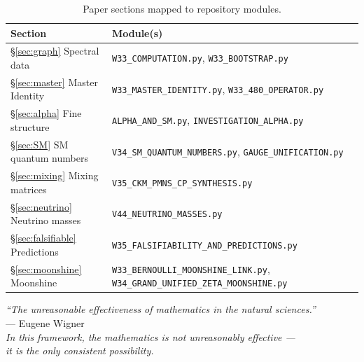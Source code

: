 \documentclass[12pt,a4paper]{article}
\begin{document}
\begin{table}[H]
\centering
\caption{Paper sections mapped to repository modules.}
\renewcommand{\arraystretch}{1.2}
\begin{tabular}{@{}lll@{}}
\toprule
Section & Module(s) \\
\midrule
\S\ref{sec:graph} Spectral data
  & \texttt{W33\_COMPUTATION.py},
    \texttt{W33\_BOOTSTRAP.py} \\
\S\ref{sec:master} Master Identity
  & \texttt{W33\_MASTER\_IDENTITY.py},
    \texttt{W33\_480\_OPERATOR.py} \\
\S\ref{sec:alpha} Fine structure
  & \texttt{ALPHA\_AND\_SM.py},
    \texttt{INVESTIGATION\_ALPHA.py} \\
\S\ref{sec:SM} SM quantum numbers
  & \texttt{V34\_SM\_QUANTUM\_NUMBERS.py},
    \texttt{GAUGE\_UNIFICATION.py} \\
\S\ref{sec:mixing} Mixing matrices
  & \texttt{V35\_CKM\_PMNS\_CP\_SYNTHESIS.py} \\
\S\ref{sec:neutrino} Neutrino masses
  & \texttt{V44\_NEUTRINO\_MASSES.py} \\
\S\ref{sec:falsifiable} Predictions
  & \texttt{W35\_FALSIFIABILITY\_AND\_PREDICTIONS.py} \\
\S\ref{sec:moonshine} Moonshine
  & \texttt{W33\_BERNOULLI\_MOONSHINE\_LINK.py},
    \texttt{W34\_GRAND\_UNIFIED\_ZETA\_MOONSHINE.py} \\
\bottomrule
\end{tabular}
\end{table}

\vspace{2em}
\begin{center}
\textit{``The unreasonable effectiveness of mathematics in the natural sciences.''}\\
--- Eugene Wigner\\
\vspace{0.5em}
\textit{In this framework, the mathematics is not unreasonably effective ---}\\
\textit{it is the only consistent possibility.}
\end{center}
\end{document}
